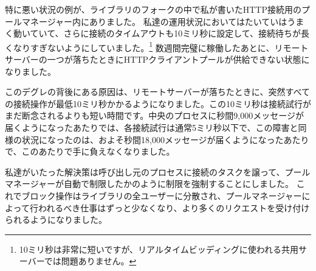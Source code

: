 特に悪い状況の例が、\href{https://github.com/ferd/lhttpc}{}ライブラリのフォークの中で私が書いたHTTP接続用のプールマネージャー内にありました。
私達の運用状況においてはたいていはうまく動いていて、さらに接続のタイムアウトも10ミリ秒に設定して、接続待ちが長くなりすぎないようにしていました。\footnote{10ミリ秒は非常に短いですが、リアルタイムビッディングに使われる共用サーバーでは問題ありません。}
数週間完璧に稼働したあとに、リモートサーバーの一つが落ちたときにHTTPクライアントプールが供給できない状態になりました。

このデグレの背後にある原因は、リモートサーバーが落ちたときに、突然すべての接続操作が最低10ミリ秒かかるようになりました。この10ミリ秒は接続試行がまだ断念されるよりも短い時間です。中央のプロセスに秒間9,000メッセージが届くようになったあたりでは、各接続試行は通常5ミリ秒以下で、この障害と同様の状況になったのは、およそ秒間18,000メッセージが届くようになったあたりで、このあたりで手に負えなくなりました。

私達がいたった解決策は呼び出し元のプロセスに接続のタスクを譲って、プールマネージャーが自動で制限したかのように制限を強制することにしました。
これでブロック操作はライブラリの全ユーザーに分散され、プールマネージャーによって行われるべき仕事はずっと少なくなり、より多くのリクエストを受け付けられるようになりました。

